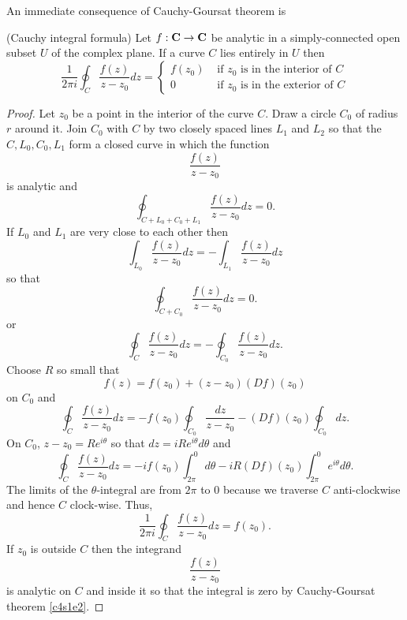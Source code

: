 An immediate consequence of Cauchy-Goursat theorem is
\begin{thm}(Cauchy integral formula)\label{c4s1t3}
Let $f:\mathbf{C} \rightarrow \mathbf{C}$ be analytic in a simply-connected open subset
$U$ of the complex plane. If a curve $C$ lies entirely in $U$ then
\begin{equation}\label{c4s1e17}
\frac{1}{2\pi i}\oint_C \frac{f(z)}{z - z_0}dz = \begin{cases}
f(z_0) & \text{ if $z_0$ is in the interior of $C$} \\
0      & \text{ if $z_0$ is in the exterior of $C$}
\end{cases}
\end{equation}
\end{thm}
\begin{proof}
Let $z_0$ be a point in the interior of the curve $C$. Draw a circle $C_0$ of 
radius $r$ around it. Join $C_0$ with $C$ by two closely spaced lines $L_1$ and
$L_2$ so that the $C, L_0, C_0, L_1$ form a closed curve in which the function
\[
\frac{f(z)}{z - z_0}
\]
is analytic and
\[
\oint_{C + L_0 + C_0 + L_1}\frac{f(z)}{z - z_0}dz = 0.
\]
If $L_0$ and $L_1$ are very close to each other then
\[
\int_{L_0} \frac{f(z)}{z - z_0}dz = 
-\int_{L_1} \frac{f(z)}{z - z_0}dz
\]
so that
\[
\oint_{C + C_0}\frac{f(z)}{z - z_0}dz = 0.
\]
or
\[
\oint_C \frac{f(z)}{z - z_0}dz = -\oint_{C_0}\frac{f(z)}{z - z_0}dz.
\]
Choose $R$ so small that
\[
f(z) = f(z_0) + (z - z_0)(Df)(z_0)
\]
on $C_0$ and
\[
\oint_C \frac{f(z)}{z - z_0}dz = -f(z_0)\oint_{C_0}\frac{dz}{z - z_0} -
 (Df)(z_0)\oint_{C_0}dz.
\]
On $C_0$, $z - z_0 = Re^{i\theta}$ so that $dz = iRe^{i\theta}d\theta$ and
\[
\oint_C \frac{f(z)}{z - z_0}dz = -if(z_0)\int_{2\pi}^0 d\theta - iR(Df)(z_0)
\int_{2\pi}^0 e^{i\theta}d\theta.
\]
The limits of the $\theta$-integral are from $2\pi$ to $0$ because we traverse
$C$ anti-clockwise and hence $C$ clock-wise. Thus,
\[
\frac{1}{2\pi i}\oint_C \frac{f(z)}{z - z_0}dz = f(z_0).
\]
If $z_0$ is outside $C$ then the integrand
\[
\frac{f(z)}{z - z_0}
\]
is analytic on $C$ and inside it so that the integral is zero by Cauchy-Goursat
theorem \ref{c4s1e2}.
\end{proof}
